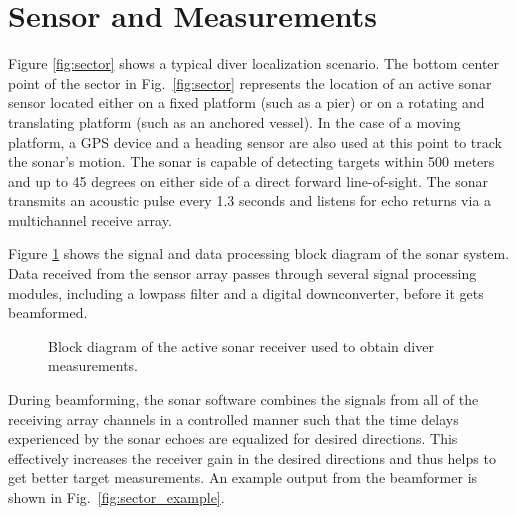 \documentclass{article} %
\begin{document}
\section{Sensor and Measurements}
Figure \ref{fig:sector} shows a typical diver localization scenario. The bottom center point of the sector in Fig.~\ref{fig:sector} represents the location of an active sonar sensor located either on a fixed platform (such as a pier) or on a rotating and translating platform (such as an anchored vessel). In the case of a moving platform, a GPS device and a heading sensor are also used at this point to track the sonar's motion.
The sonar is capable of detecting targets within 500 meters and up to 45 degrees on either side of a direct forward line-of-sight. The sonar transmits an acoustic pulse every 1.3 seconds and listens for echo returns via a multichannel receive array.

Figure \ref{fig:blocks} shows the signal and data processing block diagram of the sonar system. Data received from the sensor array passes through several signal processing modules, including a lowpass filter and a digital downconverter, before it gets beamformed.

\begin{figure}[htbp]
  \centering
  \caption{Block diagram of the active sonar receiver used to obtain diver measurements.}
  \label{fig:blocks}
\end{figure}

During beamforming, the sonar software combines the signals from all of the receiving array channels in a controlled manner such that the time delays experienced by the sonar echoes are equalized for desired directions. This effectively increases the receiver gain in the desired directions and thus helps to get better target measurements. An example output from the beamformer is shown in Fig.~\ref{fig:sector_example}.
\end{document}
